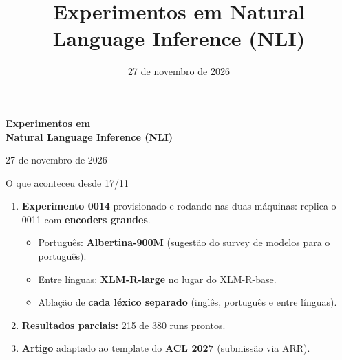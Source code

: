 \documentclass[aspectratio=169,10pt]{beamer}
\title{Experimentos em Natural Language Inference (NLI)}
\author{}
\date{27 de novembro de 2026}
\begin{document}
\begin{frame}[plain]
  \centering\vfill
  {\fontsize{30}{36}\selectfont\bfseries Experimentos em\\[4pt] Natural Language Inference (NLI)\par}
  \vspace{1.2cm}
  {\large 27 de novembro de 2026\par}
  \vfill
\end{frame}

\begin{frame}{O que aconteceu desde 17/11}
\begin{enumerate}\setlength{\itemsep}{6pt}
\item \textbf{Experimento 0014} provisionado e rodando nas duas máquinas: replica o 0011 com \textbf{encoders grandes}.
  \begin{itemize}\small
  \item Português: \textbf{Albertina-900M} (sugestão do survey de modelos para o português).
  \item Entre línguas: \textbf{XLM-R-large} no lugar do XLM-R-base.
  \item Ablação de \textbf{cada léxico separado} (inglês, português e entre línguas).
  \end{itemize}
\item \textbf{Resultados parciais:} 215 de 380 runs prontos.
\item \textbf{Artigo} adaptado ao template do \textbf{ACL 2027} (submissão via ARR).
\end{enumerate}
\end{frame}
\end{document}
